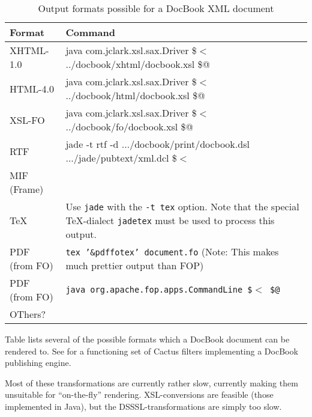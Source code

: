 \begin{table}[htbp]
  \begin{center}
    \begin{tabular}[tb]{|l|p{12cm}|}
\hline\hline
Format & Command \\
\hline
  XHTML-1.0 & java com.jclark.xsl.sax.Driver \$$<$ ../docbook/xhtml/docbook.xsl \$@\\
  HTML-4.0 & java com.jclark.xsl.sax.Driver \$$<$
  ../docbook/html/docbook.xsl \$@ \\

  XSL-FO & java com.jclark.xsl.sax.Driver \$$<$ ../docbook/fo/docbook.xsl \$@ \\
  RTF & jade -t rtf -d .../docbook/print/docbook.dsl .../jade/pubtext/xml.dcl \$$<$\\
  MIF (Frame) & \\
  {\TeX} & Use \texttt{jade} with the \texttt{-t tex} option.  Note
  that the special {\TeX}-dialect \texttt{jadetex} must be used to
  process this output.\\
  
  PDF (from FO) & \texttt{tex '\&pdffotex' document.fo}  (Note:  This
  makes much prettier output than FOP)\\
  
  PDF (from FO) & \texttt{java org.apache.fop.apps.CommandLine \$$<$
  \$@}   \\
  
  OThers? & \\
\hline
    \end{tabular}
    \caption{Output formats possible for a DocBook XML document}
    \label{tab:output-formats-possible-for-a-docbook-xml-document}
  \end{center}
\end{table}

Table 
lists several of the possible formats which a DocBook document can be
rendered to.  See  for a functioning set of
Cactus filters implementing a DocBook publishing engine.  

Most of these transformations are currently rather slow, currently
making them unsuitable for ``on-the-fly'' rendering.  XSL-conversions
are feasible (those implemented in Java), but the
DSSSL-transformations are simply too slow.





